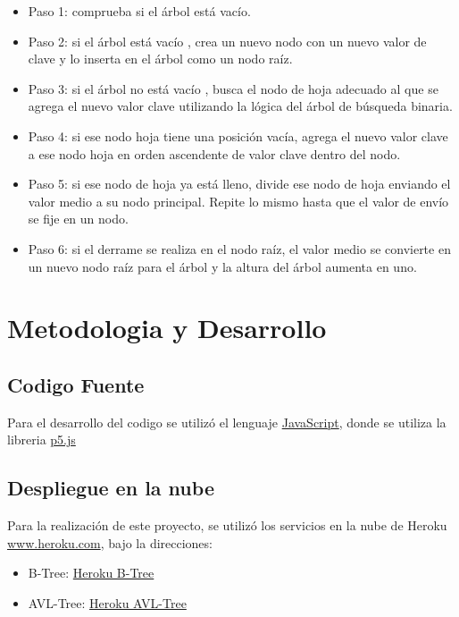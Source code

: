 \documentclass{article}
\begin{document}
\begin{enumerate}
		
\begin{itemize}
\item Paso 1: comprueba si el árbol está vacío.
 \item Paso 2: si el árbol está vacío , crea un nuevo nodo con un nuevo valor de clave y lo inserta en el árbol como un nodo raíz.
\item Paso 3: si el árbol no está vacío , busca el nodo de hoja adecuado al que se agrega el nuevo valor clave utilizando la lógica del árbol de búsqueda binaria.
\item Paso 4: si ese nodo hoja tiene una posición vacía, agrega el nuevo valor clave a ese nodo hoja en orden ascendente de valor clave dentro del nodo.
\item Paso 5: si ese nodo de hoja ya está lleno, divide ese nodo de hoja enviando el valor medio a su nodo principal. Repite lo mismo hasta que el valor de envío se fije en un nodo.
\item Paso 6: si el derrame se realiza en el nodo raíz, el valor medio se convierte en un nuevo nodo raíz para el árbol y la altura del árbol aumenta en uno.
\end{itemize}
\end{enumerate}
    \section{Metodologia y Desarrollo}
    \subsection{Codigo Fuente}
    Para el desarrollo del  codigo se utilizó el lenguaje \href{https://www.javascript.com/}{JavaScript}, donde se utiliza la libreria \href{https://p5js.org/es/}{p5.js}
    \subsection{Despliegue en la nube}
    Para la realización de este proyecto, se utilizó los servicios en la nube de Heroku \href{https://www.heroku.com/}{www.heroku.com}, bajo la direcciones:

    \begin{itemize}
        \item B-Tree: \href{https://mcc-project2-group5-btree.herokuapp.com/}{Heroku B-Tree}
        \item AVL-Tree: \href{https://mcc-project2-group5-avl.herokuapp.com/}{Heroku AVL-Tree}
    \end{itemize}
\end{document}
